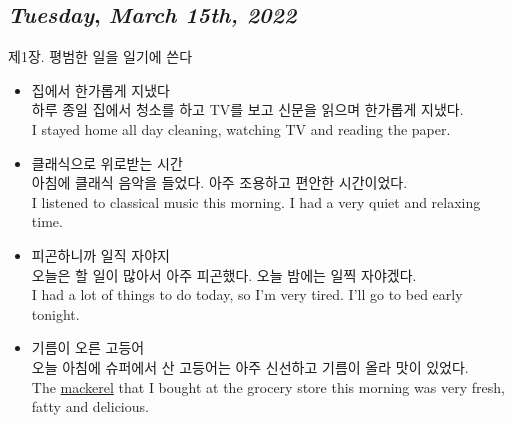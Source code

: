 \begin{center}
\section*{\month}
\end{center}

\def\day{\textit{March 15th, 2022}}
\def\weekday{\textit{Tuesday}}
\subsection*{\weekday, \day}


제1장. 평범한 일을 일기에 쓴다
\begin{itemize}
  \item 집에서 한가롭게 지냈다\\
  
  하루 종일 집에서 청소를 하고 TV를 보고 신문을 읽으며 한가롭게 지냈다.\\
  
  I stayed home all day cleaning, watching TV and reading the paper.\\
  
  \item 클래식으로 위로받는 시간\\
  
  아침에 클래식 음악을 들었다. 아주 조용하고 편안한 시간이었다.\\
  
  I listened to classical music this morning. I had a very quiet and relaxing time.\\
  
  \item 피곤하니까 일직 자야지\\
  
  오늘은 할 일이 많아서 아주 피곤했다. 오늘 밤에는 일찍 자야겠다.\\
  
  I had a lot of things to do today, so I'm very tired. I'll go to bed early tonight.\\
  
  \item 기름이 오른 고등어\\
  
  오늘 아침에 슈퍼에서 산 고등어는 아주 신선하고 기름이 올라 맛이 있었다.\\
  
  The \underline{mackerel} that I bought at the grocery store this morning was very fresh, fatty and delicious.\\
  

\end{itemize}
